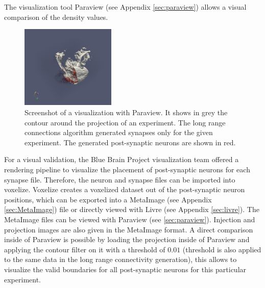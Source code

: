 The visualization tool Paraview (see Appendix \ref{sec:paraview}) allows a visual comparison of the density values.
 \begin{figure}[ht!]
\centering
\includegraphics[width=0.4\textwidth]{pictures/paraview_ex.png}
\caption{Screenshot of a visualization with Paraview. It shows in grey the contour around the projection of an experiment.
The long range connections algorithm generated synapses only for the given experiment. 
The generated post-synaptic neurons are shown in red.}
\label{fig:paraviewex}
\end{figure}
For a visual validation, the Blue Brain Project visualization team offered a rendering pipeline to visualize the placement of post-synaptic neurons for each synapse file. Therefore, the neuron and synapse files can be imported into 
voxelize. Voxelize creates a voxelized dataset out of the post-synaptic neuron positions, which can be exported into
a MetaImage (see Appendix \ref{sec:MetaImage}) file or directly viewed with Livre (see Appendix \ref{sec:livre}).
The MetaImage files can be viewed with Paraview (see \ref{sec:paraview}).
Injection and projection images are also given in the MetaImage format.
A direct comparison inside of Paraview is possible by
loading the projection inside of Paraview and applying the contour filter on it with a threshold of $0.01$ (threshold is also applied to the same data in the long range connectivity generation), this allows to visualize the valid boundaries for all post-synaptic neurons for this particular experiment.
 
